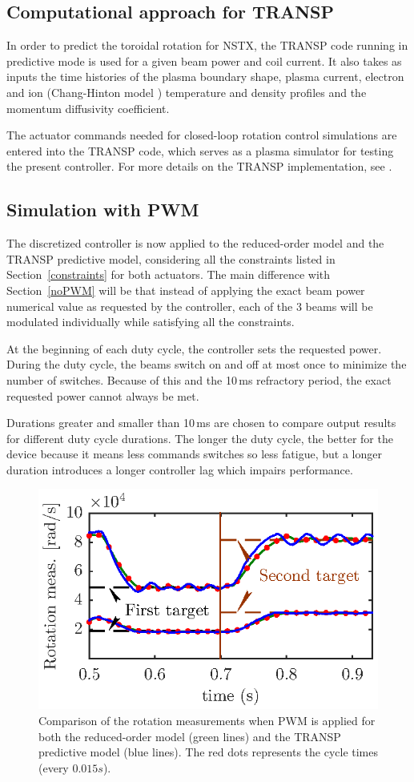 \documentclass[12pt,lot, lof]{puthesis}
\begin{document}
\subsection{Computational approach for TRANSP}
In order to predict the toroidal rotation for NSTX, the TRANSP code running in predictive mode is used for a given beam power and coil current. It also takes as inputs the time histories of the plasma boundary shape, plasma current, electron and ion (Chang-Hinton model \cite{Changhinton}) temperature and density profiles and the momentum diffusivity coefficient.

The actuator commands needed for closed-loop rotation control simulations are entered into the TRANSP code, which serves as a plasma simulator for testing the present controller. For more details on the TRANSP implementation, see \cite{Boyer15}.

\subsection{Simulation with PWM}
The discretized controller is now applied to the reduced-order model and the TRANSP predictive model, considering all the constraints listed in Section~\ref{constraints} for both actuators. The main difference with Section~\ref{noPWM} will be that instead of applying the exact beam power numerical value as requested by the controller, each of the 3 beams will be modulated individually while satisfying all the constraints.

At the beginning of each duty cycle, the controller sets the requested power. During the duty cycle, the beams switch on and off at most once to minimize the number of switches. Because of this and the 10\,ms refractory period, the exact requested power cannot always be met.

Durations greater and smaller than 10\,ms are chosen to compare output results for different duty cycle durations. The longer the duty cycle, the better for the device because it means less commands switches so less fatigue, but a longer duration introduces a longer controller lag which impairs performance.
  
\begin{figure}
	\centering
	\includegraphics[width=0.8 \linewidth]{fig16}
	\caption{Comparison of the rotation measurements when PWM is applied for both the reduced-order model (green lines) and the TRANSP predictive model (blue lines). The red dots represents the cycle times (every $0.015 s$).}
	\label{fig:rot14}
\end{figure}
\end{document}
